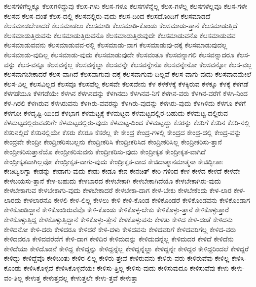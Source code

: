 {ಕೆಲಸಗಳಿಗೆಲ್ಲಕ್ಕೂ
ಕೆಲಸಗಳಿದ್ದುವು
ಕೆಲಸ-ಗಳು
ಕೆಲಸ-ಗಳೂ
ಕೆಲಸಗಳೆನ್ನೆಲ್ಲ
ಕೆಲಸ-ಗಳೆಲ್ಲ
ಕೆಲಸಗಳೆಲ್ಲವೂ
ಕೆಲಸ-ಗಳೇ
ಕೆಲಸದ
ಕೆಲಸ-ದಂತೆ
ಕೆಲಸ-ದಲ್ಲಿ
ಕೆಲಸದಲ್ಲಿರು-ವುದು
ಕೆಲಸ-ದಿಂದ
ಕೆಲಸದೊಂದಿಗೆ
ಕೆಲಸಮಾಡದೆ
ಕೆಲಸಮಾಡಬೇಕಾದರೆ
ಕೆಲಸಮಾಡಲು
ಕೆಲಸಮಾಡಿ
ಕೆಲಸಮಾಡಿ-ಕೊಂಡು
ಕೆಲಸಮಾಡು-ತ್ತಾನೆ
ಕೆಲಸಮಾಡುತ್ತಿದೆ
ಕೆಲಸಮಾಡುತ್ತಿರುವನು
ಕೆಲಸಮಾಡುತ್ತಿರುವನೊ
ಕೆಲಸಮಾಡುತ್ತಿರುವುದೇ
ಕೆಲಸಮಾಡುವನೊ
ಕೆಲಸಮಾಡುವವ
ಕೆಲಸಮಾಡುವವನು
ಕೆಲಸಮಾಡುವವ-ರಲ್ಲಿ
ಕೆಲಸಮಾಡು-ವಾಗ
ಕೆಲಸಮಾಡುವು-ದಕ್ಕೆ
ಕೆಲಸಮಾಡುವುದಲ್ಲ
ಕೆಲಸಮಾಡು-ವುದಿಲ್ಲ
ಕೆಲಸಮಾಡು-ವುದು
ಕೆಲಸಮಾಡುವುದೇ
ಕೆಲಸವಂತೂ
ಕೆಲಸವನ್ನಾಗಲಿ
ಕೆಲಸವನ್ನಾದರೂ
ಕೆಲಸ-ವನ್ನು
ಕೆಲಸ-ವನ್ನೂ
ಕೆಲಸವನ್ನೆಲ್ಲ
ಕೆಲಸವನ್ನೆಲ್ಲಾ
ಕೆಲಸವನ್ನೇ
ಕೆಲಸವನ್ನೇನೊ
ಕೆಲಸವನ್ನೇನೋ
ಕೆಲಸವನ್ನೋ
ಕೆಲಸ-ವಲ್ಲ
ಕೆಲಸವಾಗಬೇಕಾದರೆ
ಕೆಲಸ-ವಾಗಿದೆ
ಕೆಲಸವಾಗುವು-ದಕ್ಕೆ
ಕೆಲಸವಾಗುವು-ದಿಲ್ಲವೆ
ಕೆಲಸ-ವಾಗು-ವುದು
ಕೆಲಸವಾದಮೇಲೆ
ಕೆಲಸ-ವಿಲ್ಲ
ಕೆಲಸವಿಲ್ಲದ
ಕೆಲಸವೂ
ಕೆಲಸವೆಲ್ಲ
ಕೆಲಸವೇ
ಕೆಲಸವೇನು
ಕೆಳ
ಕೆಳಕೆಳಕ್ಕೆ
ಕೆಳಕ್ಕಿರುವ
ಕೆಳಕ್ಕೂ
ಕೆಳಕ್ಕೆ
ಕೆಳಗಡೆ
ಕೆಳಗಡೆಯೂ
ಕೆಳಗಡೆಯೇ
ಕೆಳಗಿನ
ಕೆಳಗಿನದನ್ನು
ಕೆಳಗಿನದು
ಕೆಳಗಿನವ-ನಿಗೆ
ಕೆಳಗಿನ-ವರು
ಕೆಳಗಿನ-ವರೆಗೆ
ಕೆಳಗಿ-ನಿಂದ
ಕೆಳ-ಗಿರಲಿ
ಕೆಳಗಿರುವ
ಕೆಳಗಿರುವನು
ಕೆಳಗಿರು-ವವರನ್ನು
ಕೆಳಗಿರು-ವುದನ್ನು
ಕೆಳಗಿರು-ವುದು
ಕೆಳಗಿಳಿದು
ಕೆಳಗೂ
ಕೆಳಗೆ
ಕೆಳಗೋ
ಕೆಳದೃಷ್ಟಿ-ಯಿಂದ
ಕೆಳಭಾಗ
ಕೆಳಮಟ್ಟಕ್ಕೆ
ಕೆಳಮಟ್ಟದ
ಕೆಳಮಟ್ಟದಲ್ಲಿರ-ಬಹುದು
ಕೆಳಮಟ್ಟ-ದಲ್ಲಿರುವ
ಕೆಳಮಟ್ಟದಲ್ಲಿರುವವರಿಗೇ
ಕೆಳಮಟ್ಟದಲ್ಲಿರು-ವುದು
ಕೆಳಮಟ್ಟ-ದಿಂದ
ಕೆಳಮಟ್ಟದ್ದು
ಕೆಸರನ್ನು
ಕೆಸರಿಗೆ
ಕೆಸರಿನ
ಕೆಸರಿ-ನಲ್ಲಿ
ಕೆಸರಿನಲ್ಲಿದೆ
ಕೆಸರಿನಲ್ಲಿಯೇ
ಕೆಸರು
ಕೆಸರೂ
ಕೆಸರೆಲ್ಲ
ಕೇ
ಕೇಂದ್ರ
ಕೇಂದ್ರ-ಗಳಲ್ಲಿ
ಕೇಂದ್ರದ
ಕೇಂದ್ರ-ದಲ್ಲಿ
ಕೇಂದ್ರ-ವನ್ನು
ಕೇಂದ್ರವೇ
ಕೇಂದ್ರೀ
ಕೇಂದ್ರೀಕರಿಸಬಲ್ಲನು
ಕೇಂದ್ರೀಕರಿಸಿ
ಕೇಂದ್ರೀಕರಿಸಿದ
ಕೇಂದ್ರೀಕರಿಸಿಲ್ಲ
ಕೇಂದ್ರೀಕರಿಸು-ತ್ತಾನೆ
ಕೇಂದ್ರೀಕರಿಸುತ್ತಾನೆಯೊ
ಕೇಂದ್ರೀಕರಿಸುವನು
ಕೇಂದ್ರೀಕರಿಸು-ವುದು
ಕೇಂದ್ರೀಕೃತ
ಕೇಂದ್ರೀಕೃತ-ವಾಗಿದೆ
ಕೇಂದ್ರೀಕೃತವಾಗಿಲ್ಲವೋ
ಕೇಂದ್ರೀಕೃತ-ವಾಗು-ವುದು
ಕೇಂದ್ರೀಕೃತ-ವಾದ
ಕೇಚಿದಾತ್ಮಾನಮಾತ್ಮನಾ
ಕೇಚಿದ್ಭೀತಾಃ
ಕೇಚಿದ್ವಿಲಗ್ನಾ
ಕೇಡನ್ನು
ಕೇಡಾಗು-ವುದು
ಕೇಡು
ಕೇಡೂ
ಕೇನ
ಕೇನಚಿತ್
ಕೇರಿ-ಗಳಿಂದ
ಕೇಳ
ಕೇಳದ
ಕೇಳದೆ
ಕೇಳದೇ
ಕೇಳಬಯಸು-ತ್ತಾನೆ
ಕೇಳ-ಬಹುದು
ಕೇಳಬಾರದ
ಕೇಳಬೇಕಾಗಿ
ಕೇಳಬೇಕಾಗಿದೆಯೊ
ಕೇಳಬೇಕಾಗಿರು-ವುದು
ಕೇಳಬೇಕಾಗುವ
ಕೇಳಬೇಕಾಗು-ವುದು
ಕೇಳಬೇಕಾದರೆ
ಕೇಳಬೇಕಾ-ದಾಗ
ಕೇಳ-ಬೇಕು
ಕೇಳಬೇಕೆಂದು
ಕೇಳ-ಲಾರ
ಕೇಳ-ಲಾರದು
ಕೇಳಲಾರನೊ
ಕೇಳಲಿ
ಕೇಳ-ಲಿಲ್ಲ
ಕೇಳಲು
ಕೇಳಿ
ಕೇಳಿ-ಕೊಂಡ
ಕೇಳಿಕೊಂಡರೆ
ಕೇಳಿಕೊಂಡವನು
ಕೇಳಿಕೊಂಡಾಗ
ಕೇಳಿಕೊಂಡಿದ್ದಾನೆ
ಕೇಳಿಕೊಂಡಿರುವೆವೊ
ಕೇಳಿ-ಕೊಂಡು
ಕೇಳಿಕೊಳ್ಳ-ಬೇಕು
ಕೇಳಿಕೊಳ್ಳು-ತ್ತಾನೆ
ಕೇಳಿಕೊಳ್ಳುತ್ತಾರೆ
ಕೇಳಿಕೊಳ್ಳುತ್ತಿದ್ದ
ಕೇಳಿಕೊಳ್ಳುತ್ತಿದ್ದಾನೆ
ಕೇಳಿಕೊಳ್ಳು-ತ್ತೇನೆ
ಕೇಳಿಕೊಳ್ಳುವನು
ಕೇಳಿತು
ಕೇಳಿದ
ಕೇಳಿ-ದಂತೆ
ಕೇಳಿದನು
ಕೇಳಿದನೋ
ಕೇಳಿ-ದರು
ಕೇಳಿದರೂ
ಕೇಳಿದರೆ
ಕೇಳಿ-ದಳು
ಕೇಳಿದವನು
ಕೇಳಿದವರಿಗೆ
ಕೇಳಿದವರಿಗೆಲ್ಲ
ಕೇಳಿದ-ವರು
ಕೇಳಿದವರೂ
ಕೇಳಿದವರೆದೆಗೆ
ಕೇಳಿ-ದಾಗ
ಕೇಳಿದಿರ
ಕೇಳಿದುದನ್ನು
ಕೇಳಿದುದನ್ನೆಲ್ಲ
ಕೇಳಿದುದರ
ಕೇಳಿದೆ
ಕೇಳಿದೆನು
ಕೇಳಿದೆಯಾ
ಕೇಳಿದೊಡನೆ
ಕೇಳಿದ್ದ
ಕೇಳಿದ್ದನ್ನು
ಕೇಳಿದ್ದನ್ನೆಲ್ಲ
ಕೇಳಿದ್ದನ್ನೆಲ್ಲಾ
ಕೇಳಿದ್ದನ್ನೇ
ಕೇಳಿದ್ದರ
ಕೇಳಿದ್ದರಿಂದಲೆ
ಕೇಳಿದ್ದರೆ
ಕೇಳಿದ್ದು
ಕೇಳಿದ್ದೆವೊ
ಕೇಳಿಬಂತು
ಕೇಳಿರ-ಲಿಲ್ಲ
ಕೇಳಿರು-ತ್ತೇವೆ
ಕೇಳಿರುವನು
ಕೇಳಿರು-ವರು
ಕೇಳಿರುವೆವು
ಕೇಳಿಲ್ಲ
ಕೇಳಿಸಿ-ಕೊಂಡು
ಕೇಳಿಸಿಕೊಳ್ಳದೆ
ಕೇಳಿಸಿಕೊಳ್ಳದೆಯೇ
ಕೇಳಿಸು-ತ್ತಿಲ್ಲ
ಕೇಳಿಸು-ವುದು
ಕೇಳಿಸುವುದೂ
ಕೇಳಿಸುವೆವು
ಕೇಳು
ಕೇಳು-ವಂ-ತಿಲ್ಲ
ಕೇಳುತ್ತ
ಕೇಳುತ್ತದಲ್ಲ
ಕೇಳುತ್ತಲೇ
ಕೇಳು-ತ್ತವೆ
ಕೇಳುತ್ತಾ
}
